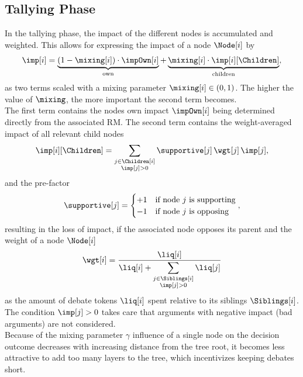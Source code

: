 \documentclass[%
aip,
amsmath,amssymb,
reprint,%
unsortedaddress,
nofootinbib
]{revtex4-2}
\begin{document}
\subsection{Tallying Phase}\label{sec:TallyingPhase}
In the tallying phase, the impact of the different nodes is accumulated and weighted.
This allows for expressing the impact of a node $\Node[i]$ by
\begin{equation}\label{eq:Impact}
	\imp[i] = 
	\underbrace{(1-\mixing[i])\cdot\impOwn[i]}_{\text{own}} 
	+
	\underbrace{\mixing[i]\cdot\imp[i][\Children]}_{\text{children}},
\end{equation}
as two terms scaled with a mixing parameter $\mixing[i]\in(0,1)$.
The higher the value of $\mixing$, the more important the second term becomes.
\\
The first term contains the nodes own impact $\impOwn[i]$ being determined directly from the associated \ac{RM}.
The second term contains the weight-averaged impact of all relevant child nodes
\begin{equation}
	\imp[i][\Children] = \sum_{
		\substack{
			j\in \Children[i]\\
			\imp[j] > 0
		}
	}
	\supportive[j]\,\wgt[j]\,\imp[j],
\end{equation}
and the pre-factor
\begin{equation}
	\supportive[j]
	=
	\begin{cases}
		+1 & \text{if node $j$ is supporting}\\
		-1 & \text{if node $j$ is opposing}
	\end{cases},
\end{equation}
resulting in the loss of impact, if the associated node opposes its parent 
and the weight of a node $\Node[i]$
\begin{equation}
	\wgt[i] = \frac{\liq[i]}{\liq[i]+\displaystyle\sum_{
		\substack{
			j\in \Siblings[i]\\
			\imp[j] > 0
		}
	}
	\liq[j]}
\end{equation}
as the amount of debate tokens $\liq[i]$ spent relative to its siblings $\Siblings[i]$.
The condition $\imp[j] > 0$ takes care that arguments with negative impact (bad arguments) are not considered.
\\
Because of the mixing parameter $\gamma$ influence of a single node on the decision outcome decreases with increasing distance from the tree root, 
it becomes less attractive to add too many layers to the tree, which incentivizes keeping debates short.
\end{document}
